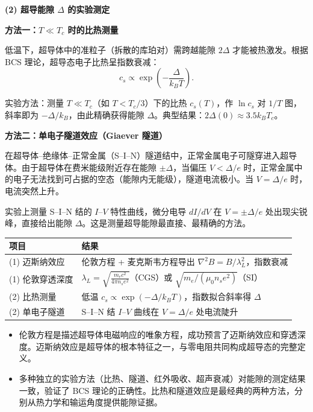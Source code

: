 \begin{derivationbox}[标准解题过程]
\textbf{(2) 超导能隙 $\Delta$ 的实验测定}

\textbf{方法一：$T\ll T_c$ 时的比热测量}

低温下，超导体中的准粒子（拆散的库珀对）需跨越能隙 $2\Delta$ 才能被热激发。根据 BCS 理论，超导态电子比热呈指数衰减：
\begin{equation}
c_s\propto\exp\!\left(-\frac{\Delta}{k_BT}\right).
\end{equation}

实验方法：测量 $T\ll T_c$（如 $T<T_c/3$）下的比热 $c_s(T)$，作 $\ln c_s$ 对 $1/T$ 图，斜率即为 $-\Delta/k_B$，由此精确获得能隙 $\Delta$。典型结果：$2\Delta(0)\approx3.5k_BT_c$。

\textbf{方法二：单电子隧道效应（Giaever 隧道）}

在超导体--绝缘体--正常金属（S--I--N）隧道结中，正常金属电子可隧穿进入超导体。由于超导体在费米能级附近存在能隙 $\pm\Delta$，当偏压 $V<\Delta/e$ 时，正常金属中的电子无法找到可占据的空态（能隙内无能级），隧道电流极小。当 $V=\Delta/e$ 时，电流突然上升。

实验上测量 S--I--N 结的 $I$--$V$ 特性曲线，微分电导 $dI/dV$ 在 $V=\pm\Delta/e$ 处出现尖锐峰，直接给出能隙 $\Delta$。这是测量超导能隙最直接、最精确的方法。
\end{derivationbox}

\begin{formulabox}[答案汇总]
\begin{center}
\begin{tabular}{ll}
\toprule
\textbf{项目} & \textbf{结果} \\
\midrule
(1) 迈斯纳效应 & 伦敦方程 + 麦克斯韦方程导出 $\nabla^2B=B/\lambda_L^2$，指数衰减 \\
(1) 伦敦穿透深度 & $\displaystyle\lambda_L=\sqrt{\frac{m_ec^2}{4\pi n_se^2}}$（CGS）或 $\sqrt{m_e/(\mu_0n_se^2)}$（SI） \\
(2) 比热测量 & 低温 $c_s\propto\exp(-\Delta/k_BT)$，指数拟合斜率得 $\Delta$ \\
(2) 单电子隧道 & S--I--N 结 $I$--$V$ 曲线在 $V=\Delta/e$ 处电流陡升 \\
\bottomrule
\end{tabular}
\end{center}
\end{formulabox}

\begin{insightbox}[物理图像]
\begin{itemize}
    \item 伦敦方程是描述超导体电磁响应的唯象方程，成功预言了迈斯纳效应和穿透深度。迈斯纳效应是超导体的根本特征之一，与零电阻共同构成超导态的完整定义。
    \item 多种独立的实验方法（比热、隧道、红外吸收、超声衰减）对能隙的测定结果一致，验证了 BCS 理论的正确性。比热和隧道效应是最经典的两种方法，分别从热力学和输运角度提供能隙证据。
\end{itemize}
\end{insightbox}

